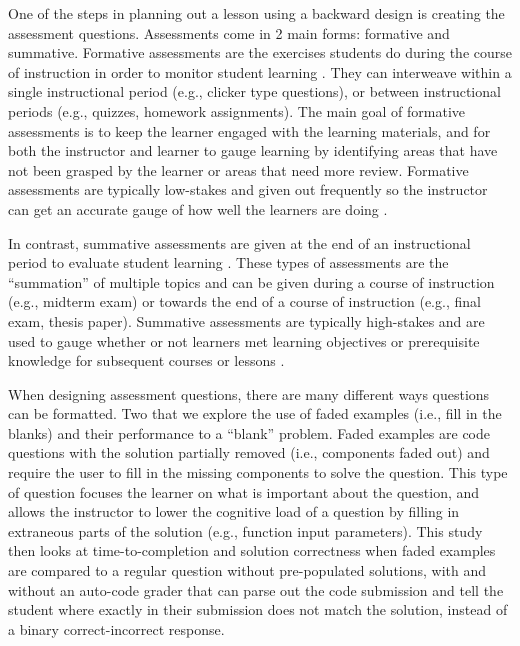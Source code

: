 \documentclass[acmsmall]{acmart}
\begin{document}
One of the steps in planning out a lesson using a backward design is creating the assessment questions.
Assessments come in 2 main forms: formative and summative.
Formative assessments are the exercises students do during the course of instruction
in order to monitor student learning
\cite{universityFormativeVsSummative, wilson2019teaching}.
They can interweave within a single instructional period (e.g., clicker type questions),
or between instructional periods (e.g., quizzes, homework assignments).
The main goal of formative assessments is to keep the learner engaged with the learning materials,
and for both the instructor and learner to gauge learning by identifying areas that have not been grasped by the
learner or areas that need more review.
Formative assessments are typically low-stakes and given out frequently so the instructor
can get an accurate gauge of how well the learners are doing
\cite{universityFormativeVsSummative, wilson2019teaching}.

In contrast, summative assessments are given at the end of an instructional period
to evaluate student learning
\cite{universityFormativeVsSummative, wilson2019teaching}.
These types of assessments are the ``summation'' of multiple topics and can be given
during a course of instruction (e.g., midterm exam)
or towards the end of a course of instruction (e.g., final exam, thesis paper).
Summative assessments are typically high-stakes and
are used to gauge whether or not learners met learning objectives or
prerequisite knowledge for subsequent courses or lessons
\cite{universityFormativeVsSummative, wilson2019teaching}.

When designing assessment questions, there are many different ways questions can be formatted.
Two that we explore the use of faded examples (i.e., fill in the blanks)
and their performance to a ``blank'' problem.
Faded examples are code questions with the solution partially removed (i.e., components faded out)
and require the user to fill in the missing components to solve the question.
This type of question focuses the learner on what is important about the question,
and allows the instructor to lower the cognitive load of a question by filling in
extraneous parts of the solution (e.g., function input parameters).
This study then looks at time-to-completion and solution correctness
when faded examples are compared to a regular question without pre-populated solutions,
with and without an auto-code grader that can parse out the code submission and
tell the student where
exactly in their submission does not match the solution,
instead of a binary correct-incorrect response.
\end{document}
